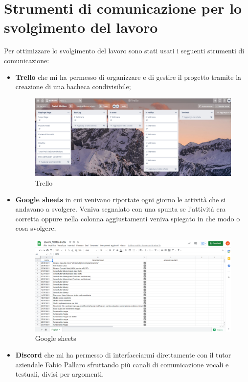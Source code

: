 \section{Strumenti di comunicazione per lo svolgimento del lavoro}
Per ottimizzare lo svolgimento del lavoro sono stati usati i seguenti strumenti di comunicazione:
\begin{itemize}
	\item \textbf{Trello} che mi ha permesso di organizzare e di gestire il progetto tramite la creazione di una bacheca condivisibile;
	\begin{figure}[htbp]	
		\centering
		\includegraphics[width=12cm]{immagini/trello.png}
		\caption{Trello}
		\label{fig:Trello}
	\end{figure}
	\item \textbf{Google sheets} in cui venivano riportate ogni giorno le attività che si andavano a svolgere. Veniva segnalato con una spunta se l'attività era corretta oppure nella colonna aggiustamenti veniva spiegato in che modo o cosa svolgere;
	\begin{figure}[htbp]	
		\centering
		\includegraphics[width=12cm]{immagini/googlesheet.png}
		\caption{Google sheets}
		\label{fig:Google sheets}
	\end{figure}
	\item \textbf{Discord} che mi ha permesso di interfacciarmi direttamente
	con il tutor aziendale Fabio Pallaro sfruttando più canali di comunicazione vocali e testuali, divisi per argomenti.
\end{itemize}
	


